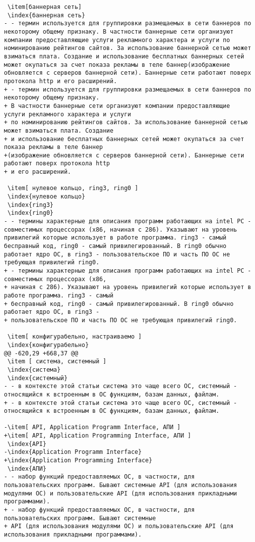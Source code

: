 \begin{verbatim}
 \item[баннерная сеть]
 \index{баннерная сеть}
- - термин используется для группировки размещаемых в сети баннеров по некоторому общему признаку. В частности баннерные сети организуют компании предоставляющие услуги рекламного характера и услуги по номинированию рейтингов сайтов. За использование баннерной сетью может взиматься плата. Создание и использование бесплатных баннерных сетей может окупаться за счет показа рекламы в теле баннер(изображение обновляется с серверов баннерной сети). Баннерные сети работают поверх протокола http и его расширений.
+ - термин используется для группировки размещаемых в сети баннеров по некоторому общему признаку.
+ В частности баннерные сети организуют компании предоставляющие услуги рекламного характера и услуги
+ по номинированию рейтингов сайтов. За использование баннерной сетью может взиматься плата. Создание
+ и использование бесплатных баннерных сетей может окупаться за счет показа рекламы в теле баннер
+(изображение обновляется с серверов баннерной сети). Баннерные сети работают поверх протокола http
+ и его расширений.

 \item[ нулевое кольцо, ring3, ring0 ]
 \index{нулевое кольцо}
 \index{ring3}
 \index{ring0}
- - термины характерные для описания программ работающих на intel PC - совместимых процессорах (x86, начиная с 286). Указывают на уровень привилегий которые использует в работе программа. ring3 - самый бесправный код, ring0 - самый привилегированный. В ring0 обычно работает ядро ОС, в ring3 - пользовательское ПО и часть ПО ОС не требующая привилегий ring0.
+ - термины характерные для описания программ работающих на intel PC - совместимых процессорах (x86,
+ начиная с 286). Указывают на уровень привилегий которые использует в работе программа. ring3 - самый
+ бесправный код, ring0 - самый привилегированный. В ring0 обычно работает ядро ОС, в ring3 -
+ пользовательское ПО и часть ПО ОС не требующая привилегий ring0.

 \item[ конфигурабельно, настраиваемо ]
 \index{конфигурабельно}
@@ -620,29 +668,37 @@
 \item [ система, системный ]
 \index{система}
 \index{системный}
- - в контексте этой статьи система это чаще всего ОС, системный - относящийся к встроенным в ОС функциям, базам данных, файлам.
+ - в контексте этой статьи система это чаще всего ОС, системный - относящийся к встроенным в ОС функциям, базам данных, файлам.

-\item[ API, Application Programm Interface, АПИ ]
+\item[ API, Application Programming Interface, АПИ ]
 \index{API}
-\index{Application Programm Interface}
+\index{Application Programming Interface}
 \index{АПИ}
- - набор функций предоставляемых ОС, в частности, для пользовательских программ. Бывают системные API (для использования модулями ОС) и пользовательские API (для использования прикладными программами).
+ - набор функций предоставляемых ОС, в частности, для пользовательских программ. Бывают системные
+ API (для использования модулями ОС) и пользовательские API (для использования прикладными программами).


\end{verbatim}

